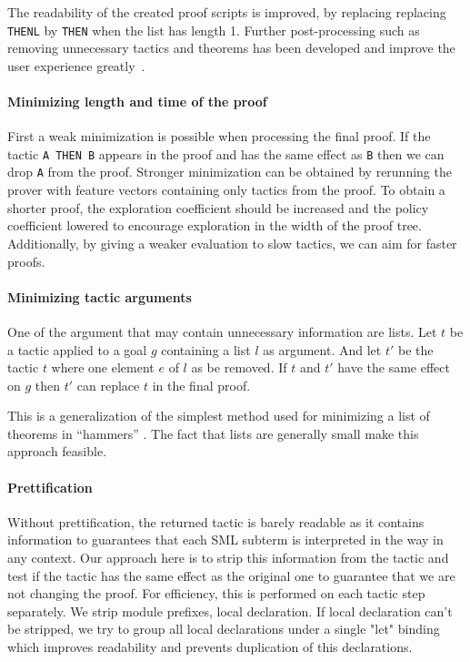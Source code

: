 \documentclass[runningheads,a4paper,draft]{svjour3}
\def\sml{\textsf{SML}\xspace}
\begin{document}
The readability of the created proof scripts is improved, by replacing
replacing  \texttt{THENL} by \texttt{THEN} when the list has length 1.
Further post-processing such as
removing unnecessary tactics and theorems has been developed and
improve the user experience greatly~\cite{DBLP:conf/sefm/Adams15}.

\paragraph{Minimizing length and time of the proof} 
First a weak minimization is possible when processing the final proof. If the 
tactic \texttt{A THEN B} appears in the proof and has the same effect as 
\texttt{B} then we can drop \texttt{A} from the proof.
Stronger minimization can be obtained by rerunning the prover with feature 
vectors containing only tactics 
from the proof. To obtain a shorter proof, the exploration coefficient should be
increased and the policy coefficient lowered to encourage exploration in the 
width of the proof tree. Additionally, by giving a weaker evaluation to slow 
tactics, we can aim for faster proofs.

\paragraph{Minimizing tactic arguments}
One of the argument that may contain unnecessary information are lists.
Let $t$ be a tactic applied to a goal $g$ containing a list $l$ as argument. 
And let $t'$ be the tactic $t$ where one element $e$ of $l$ as be removed. If 
$t$ and $t'$ have the same effect on $g$ then $t'$ can replace $t$ in the final 
proof.

This is a generalization of the simplest method used for minimizing a list of 
theorems in ``hammers'' \cite{}. The fact that lists are generally small
make this approach feasible.

\paragraph{Prettification}
Without prettification, the returned tactic is barely readable as it contains 
information to guarantees that each \sml subterm is interpreted in the way in 
any context. Our approach here is to strip this information from the tactic and 
test if the tactic has the same effect as the original one to guarantee that we 
are not changing the proof. For efficiency, 
this is performed on each tactic step separately. We strip module prefixes, 
local declaration. If local declaration can't be 
stripped, we try to group all local declarations under a single "let" binding 
which improves readability and prevents duplication of this declarations.
\end{document}
